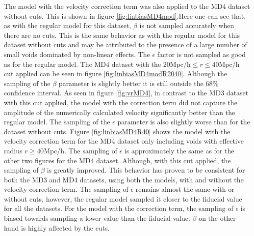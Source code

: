 The model with the velocity correction term was also applied to the MD4 dataset without cuts. This is shown in figure \ref{fig:linbiasMD4mod}.Here one can see that, as with the regular model for this dataset, $\beta$ is not sampled accurately when there are no cuts. 
This is the same behavior as with the regular model for this dataset without cuts and may be attributed to the presence of a large number of small voids dominated by non-linear effects. The $\epsilon$ factor is not sampled as good as for the regular model. The MD4 dataset with the $20$Mpc/h$\leq r\leq 40$Mpc/h cut applied can be seen in figure \ref{fig:linbiasMD4modR2040}. Although the sampling of the $\beta$ parameter is slightly better it is still outside the $68\%$ confidence interval. As seen in figure \ref{fig:vrMD4}, in contrast to the MD3 dataset with this cut applied, the model with the correction term did not capture the amplitude of the numerically calculated velocity significantly better than the regular model. The sampling of the $\epsilon$ parameter is also slightly worse than for the dataset without cuts. Figure \ref{fig:linbiasMD4R40} shows the model with the velocity correction term for the MD4 dataset only including voids with effective radius $r\geq 40$Mpc/h. The sampling of $\epsilon$ is approximately the same as for the other two figures for the MD4 dataset. Although, with this cut applied, the sampling of $\beta$ is greatly improved. This behavior has proven to be consistent for both the MD3 and MD4 datasets, using both the models, with and without the velocity correction term. The sampling of $\epsilon$ remains almost the same with or without cuts, however, the regular model sampled it closer to the fiducial value for all the datasets. For the model with the correction term, the sampling of $\epsilon$ is biased towards sampling a lower value than the fiducial value. $\beta$ on the other hand is highly affected by the cuts.

